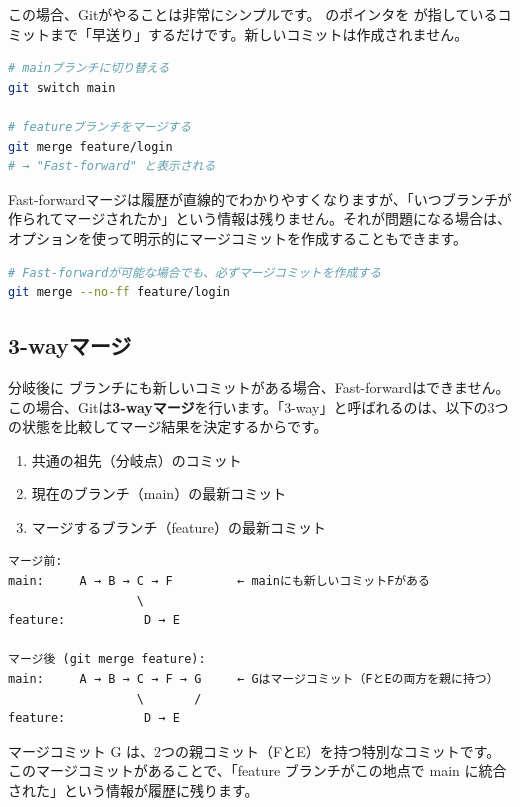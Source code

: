 この場合、Gitがやることは非常にシンプルです。 のポインタを  が指しているコミットまで「早送り」するだけです。新しいコミットは作成されません。

\begin{lstlisting}[language=bash]
# mainブランチに切り替える
git switch main

# featureブランチをマージする
git merge feature/login
# → "Fast-forward" と表示される
\end{lstlisting}

Fast-forwardマージは履歴が直線的でわかりやすくなりますが、「いつブランチが作られてマージされたか」という情報は残りません。それが問題になる場合は、 オプションを使って明示的にマージコミットを作成することもできます。

\begin{lstlisting}[language=bash]
# Fast-forwardが可能な場合でも、必ずマージコミットを作成する
git merge --no-ff feature/login
\end{lstlisting}

\subsection{3-wayマージ}

分岐後に  ブランチにも新しいコミットがある場合、Fast-forwardはできません。この場合、Gitは\textbf{3-wayマージ}を行います。「3-way」と呼ばれるのは、以下の3つの状態を比較してマージ結果を決定するからです。

\begin{enumerate}
  \item 共通の祖先（分岐点）のコミット
  \item 現在のブランチ（main）の最新コミット
  \item マージするブランチ（feature）の最新コミット
\end{enumerate}

\begin{lstlisting}[language={}]
マージ前:
main:     A → B → C → F         ← mainにも新しいコミットFがある
                  \
feature:           D → E

マージ後 (git merge feature):
main:     A → B → C → F → G     ← Gはマージコミット（FとEの両方を親に持つ）
                  \       /
feature:           D → E
\end{lstlisting}

マージコミット G は、2つの親コミット（FとE）を持つ特別なコミットです。このマージコミットがあることで、「feature ブランチがこの地点で main に統合された」という情報が履歴に残ります。

